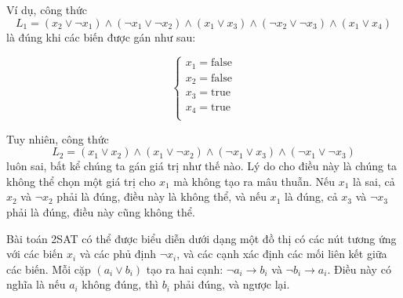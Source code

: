 Ví dụ, công thức
\[
L_1 = (x_2 \lor \lnot x_1) \land
      (\lnot x_1 \lor \lnot x_2) \land
      (x_1 \lor x_3) \land
      (\lnot x_2 \lor \lnot x_3) \land
      (x_1 \lor x_4)
\]
là đúng khi các biến được gán như sau:

\[
\begin{cases}
x_1 = \textrm{false} \\
x_2 = \textrm{false} \\
x_3 = \textrm{true} \\
x_4 = \textrm{true} \\
\end{cases}
\]

Tuy nhiên, công thức
\[
L_2 = (x_1 \lor x_2) \land
      (x_1 \lor \lnot x_2) \land
      (\lnot x_1 \lor x_3) \land
      (\lnot x_1 \lor \lnot x_3)
\]
luôn sai, bất kể chúng ta
gán giá trị như thế nào.
Lý do cho điều này là chúng ta không thể
chọn một giá trị cho $x_1$
mà không tạo ra mâu thuẫn.
Nếu $x_1$ là sai, cả $x_2$ và $\lnot x_2$
phải là đúng, điều này là không thể,
và nếu $x_1$ là đúng, cả $x_3$ và $\lnot x_3$
phải là đúng, điều này cũng không thể.

Bài toán 2SAT có thể được biểu diễn dưới dạng một đồ thị
có các nút tương ứng với
các biến $x_i$ và các phủ định $\lnot x_i$,
và các cạnh xác định các mối liên kết
giữa các biến.
Mỗi cặp $(a_i \lor b_i)$ tạo ra hai cạnh:
$\lnot a_i \to b_i$ và $\lnot b_i \to a_i$.
Điều này có nghĩa là nếu $a_i$ không đúng,
thì $b_i$ phải đúng, và ngược lại.

